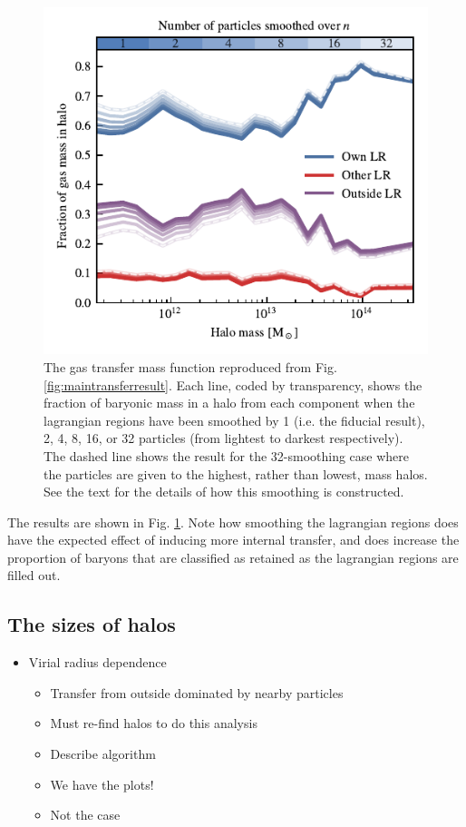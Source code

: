 \begin{figure}
	\centering
	\includegraphics{figures/convergence_smoothing.pdf}
	\vspace{-0.7cm}
	\caption{The gas transfer mass function reproduced from Fig.
		\ref{fig:maintransferresult}. Each line, coded by transparency,
		shows the fraction of baryonic mass in a halo from each component
		when the lagrangian regions have been smoothed by 1 (i.e. the fiducial result), 2, 4, 8, 16,
		or 32 particles (from lightest to darkest respectively). The dashed
		line shows the result for the 32-smoothing case where the particles are
		given to the highest, rather than lowest, mass halos. See the
		text for the details of how this smoothing is constructed.
	}
	\label{fig:smoothconv}
\end{figure}

The results are shown in Fig. \ref{fig:smoothconv}. Note how smoothing the
lagrangian regions does have the expected effect of inducing more internal
transfer, and does increase the proportion of baryons that are classified
as retained as the lagrangian regions are filled out.

\subsection{The sizes of halos}


\begin{itemize}
	\item Virial radius dependence
		\begin{itemize}
			\item Transfer from outside dominated by nearby particles
			\item Must re-find halos to do this analysis
			\item Describe algorithm
			\item We have the plots!
			\item Not the case
		\end{itemize}
\end{itemize}
